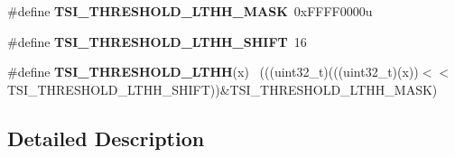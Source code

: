 \begin{DoxyCompactItemize}
\item 
\hypertarget{group___t_s_i___register___masks_gafca3993e4d443bff9e8a948c8da493fb}{}\#define {\bfseries T\+S\+I\+\_\+\+T\+H\+R\+E\+S\+H\+O\+L\+D\+\_\+\+L\+T\+H\+H\+\_\+\+M\+A\+S\+K}~0x\+F\+F\+F\+F0000u\label{group___t_s_i___register___masks_gafca3993e4d443bff9e8a948c8da493fb}

\item 
\hypertarget{group___t_s_i___register___masks_gab010aabd2e3e83825b47d94614f49655}{}\#define {\bfseries T\+S\+I\+\_\+\+T\+H\+R\+E\+S\+H\+O\+L\+D\+\_\+\+L\+T\+H\+H\+\_\+\+S\+H\+I\+F\+T}~16\label{group___t_s_i___register___masks_gab010aabd2e3e83825b47d94614f49655}

\item 
\hypertarget{group___t_s_i___register___masks_ga5b68cec3fba7c3ff01a8f0f4d1986c43}{}\#define {\bfseries T\+S\+I\+\_\+\+T\+H\+R\+E\+S\+H\+O\+L\+D\+\_\+\+L\+T\+H\+H}(x)                                    ~(((uint32\+\_\+t)(((uint32\+\_\+t)(x))$<$$<$T\+S\+I\+\_\+\+T\+H\+R\+E\+S\+H\+O\+L\+D\+\_\+\+L\+T\+H\+H\+\_\+\+S\+H\+I\+F\+T))\&T\+S\+I\+\_\+\+T\+H\+R\+E\+S\+H\+O\+L\+D\+\_\+\+L\+T\+H\+H\+\_\+\+M\+A\+S\+K)\label{group___t_s_i___register___masks_ga5b68cec3fba7c3ff01a8f0f4d1986c43}

\end{DoxyCompactItemize}


\subsection{Detailed Description}
